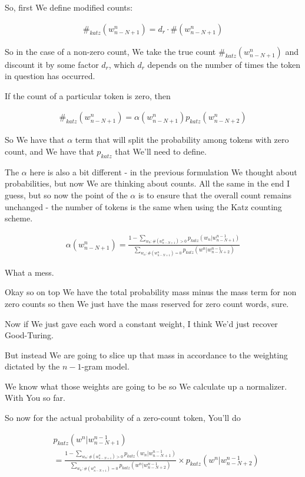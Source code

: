 \documentclass{article}
\begin{document}
		So, first We define modified counts:
		
		\begin{align}
			\#_{katz}(w^n_{n-N+1}) = d_r\cdot \#(w^n_{n-N+1})
		\end{align}
		
		So in the case of a non-zero count, We take the true count $\#_{katz}(w^n_{n-N+1})$ and discount it by some factor $d_r$, which $d_r$ depends on the number of times the token in question has occurred.
		
		If the count of a particular token is zero, then
		
		\begin{align}
			\#_{katz}(w^n_{n-N+1}) = \alpha(w^n_{n-N+1})p_{katz}(w^n_{n-N+2})
		\end{align}
		
		So We have that $\alpha$ term that will split the probability among tokens with zero count, and We have that $p_{katz}$ that We'll need to define. 
		
		The $\alpha$ here is also a bit different - in the previous formulation We thought about probabilities, but now We are thinking about counts. All the same in the end I guess, but so now the point of the $\alpha$ is to ensure that the overall count remains unchanged - the number of tokens is the same when using the Katz counting scheme.
		
		\begin{align}
			\alpha(w^n_{n-N+1}) = \frac{1 - \sum_{w_n:\#(w^n_{n-N+1})>0} p_{katz}(w_n|w^{n-1}_{n-N+1})}{\sum_{w_n:\#(w^n_{n-N+1})=0} p_{katz}(w^n|w^{n-1}_{n-N+2})}
		\end{align}
		
		What a mess.
		
		Okay so on top We have the total probability mass minus the mass term for non zero counts so then We just have the mass reserved for zero count words, sure.
		
		Now if We just gave each word a constant weight, I think We'd just recover Good-Turing.
		
		But instead We are going to slice up that mass in accordance to the weighting dictated by the $n-1$-gram model.
		
		We know what those weights are going to be so We calculate up a normalizer. With You so far.
		
		So now for the actual probability of a zero-count token, You'll do
		
		\begin{align}
			&p_{katz}(w^n|w^{n-1}_{n-N+1}) \\
			&= \frac{1 - \sum_{w_n:\#(w^n_{n-N+1})>0} p_{katz}(w_n|w^{n-1}_{n-N+1})}{\sum_{w_n:\#(w^n_{n-N+1})=0} p_{katz}(w^n|w^{n-1}_{n-N+2})} \times p_{katz}(w^n|w^{n-1}_{n-N+2})
		\end{align}
		
\end{document}
